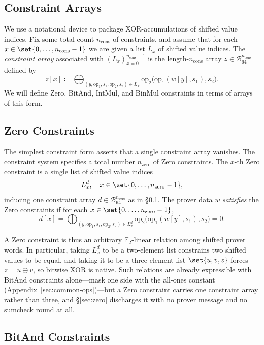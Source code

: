 \documentclass{article}
\theoremstyle{definition}
\newcommand{\BB}{\mathcal{B}}
\newcommand{\FF}[1]{\mathbb{F}_{#1}}
\begin{document}
\subsection{Constraint Arrays}
\label{sec:constraint-arrays}

We use a notational device to package XOR-accumulations of shifted value indices. Fix some total count $n_\text{cons}$ of constraints, and assume that for each $x \in \set{0, \ldots, n_\text{cons} - 1}$ we are given a list $L_x$ of shifted value indices. The \emph{constraint array} associated with $(L_x)_{x = 0}^{n_\text{cons} - 1}$ is the length-$n_\text{cons}$ array $z \in \BB_{64}^{n_\text{cons}}$ defined by
\[
  z[x] \coloneqq \bigoplus_{(y, \text{op}_1, s_1, \text{op}_2, s_2) \in L_x} \text{op}_2\bigl( \text{op}_1(w[y], s_1), s_2 \bigr).
\]
We will define Zero, BitAnd, IntMul, and BinMul constraints in terms of arrays of this form.

\subsection{Zero Constraints}
\label{sec:zero-constraints}

The simplest constraint form asserts that a single constraint array vanishes. The constraint system specifies a total number $n_\text{zero}$ of Zero constraints. The $x$-th Zero constraint is a single list of shifted value indices
\[
  L^d_x, \quad x \in \set{0, \ldots, n_\text{zero} - 1},
\]
inducing one constraint array $d \in \BB_{64}^{n_\text{zero}}$ as in \S\ref{sec:constraint-arrays}. The prover data $w$ \emph{satisfies} the Zero constraints if for each $x \in \set{0, \ldots, n_\text{zero} - 1}$,
\[
  d[x] = \bigoplus_{(y, \text{op}_1, s_1, \text{op}_2, s_2) \in L^d_x} \text{op}_2\bigl( \text{op}_1(w[y], s_1), s_2 \bigr) = 0.
\]

A Zero constraint is thus an arbitrary $\FF{2}$-linear relation among shifted prover words. In particular, taking $L^d_x$ to be a two-element list constrains two shifted values to be equal, and taking it to be a three-element list $\set{u, v, z}$ forces $z = u \oplus v$, so bitwise XOR is native. Such relations are already expressible with BitAnd constraints alone---mask one side with the all-ones constant (Appendix~\ref{sec:common-ops})---but a Zero constraint carries one constraint array rather than three, and \S\ref{sec:zero} discharges it with no prover message and no sumcheck round at all.

\subsection{BitAnd Constraints}
\label{sec:bitand-constraints}
\end{document}
